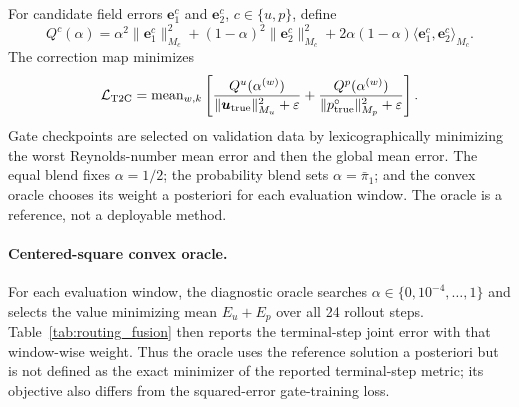 For candidate field errors $\bm e_1^c$ and $\bm e_2^c$,
$c\in\{u,p\}$, define
\begin{equation}
 Q^c(\alpha)=\alpha^2\|\bm e_1^c\|_{M_c}^2
 +(1-\alpha)^2\|\bm e_2^c\|_{M_c}^2
 +2\alpha(1-\alpha)\langle\bm e_1^c,\bm e_2^c\rangle_{M_c}.
\end{equation}
The correction map minimizes
\begin{equation}
 \mathcal L_{\rm T2C}=\operatorname{mean}_{w,k}\left[
 \frac{Q^u(\alpha^{(w)})}{\|\bm u_{\rm true}\|_{M_u}^2+\varepsilon}
 +\frac{Q^p(\alpha^{(w)})}{\|p^\circ_{\rm true}\|_{M_p}^2+\varepsilon}
 \right].
 \label{eq:app_t2c_loss}
\end{equation}
Gate checkpoints are selected on validation data by lexicographically
minimizing the worst Reynolds-number mean error and then the global mean
error. The equal blend fixes $\alpha=1/2$; the probability blend sets
$\alpha=\bar\pi_1$; and the convex oracle chooses its weight a posteriori for
each evaluation window. The oracle is a reference, not a deployable method.

\paragraph{Centered-square convex oracle.}
For each evaluation window, the diagnostic oracle searches
$\alpha\in\{0,10^{-4},\ldots,1\}$ and selects the value minimizing mean
$E_u+E_p$ over all 24 rollout steps. Table~\ref{tab:routing_fusion} then reports
the terminal-step joint error with that window-wise weight. Thus the oracle
uses the reference solution a posteriori but is not defined as the exact
minimizer of the reported terminal-step metric; its objective also differs
from the squared-error gate-training loss.
